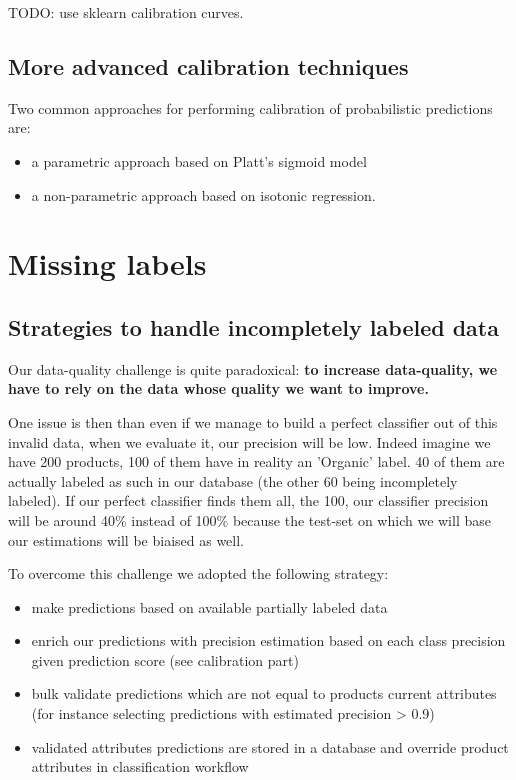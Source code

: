TODO: use sklearn calibration curves.

\subsection{More advanced calibration techniques}

Two common approaches for performing calibration of probabilistic predictions are: 
\begin{itemize}
	\item a parametric approach based on Platt’s sigmoid model 
	\item a non-parametric approach based on isotonic regression.
\end{itemize}
\cite{Calibration}

\section{Missing labels}

\subsection{Strategies to handle incompletely labeled data}

Our data-quality challenge is quite paradoxical: \textbf{to increase data-quality, we have to rely on the data whose quality we want to improve.}

One issue is then than even if we manage to build a perfect classifier out of this invalid data, when we evaluate it, our precision will be low. Indeed imagine we have 200 products, 100 of them have in reality an 'Organic' label. 40 of them are actually labeled as such in our database (the other 60 being incompletely labeled). If our perfect classifier finds them all, the 100, our classifier precision will be around 40\% instead of 100\% because the test-set on which we will base our estimations will be biaised as well.

To overcome this challenge we adopted the following strategy:

\begin{itemize}
	\item make predictions based on available partially labeled data
	\item enrich our predictions with precision estimation based on each class precision given prediction score (see calibration part)
	\item bulk validate predictions which are not equal to products current attributes (for instance selecting predictions with estimated precision > 0.9)
	\item validated attributes predictions are stored in a database and override product attributes in classification workflow
\end{itemize}

